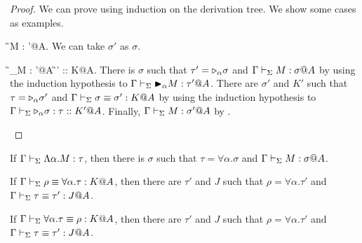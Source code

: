 \begin{proof}
    We can prove using induction on the derivation tree.
    We show some cases as examples.

    \begin{rneqncase}{\TTB{}}{\G \V M : \sigma'@A\alpha.}
        We can take $\sigma'$ as $\sigma$.
    \end{rneqncase}
    \begin{rneqncase}{\TConv{}}{
            \G \V \TB_\alpha M : \tau'@A  \G\V\tau' \E \tau :: K@A.
            }
            There is $\sigma$ such that $\tau' = {\mathop{\triangleright}}_\alpha \sigma$ and $\G \V M : \sigma@A$
            by using the induction hypothesis to \( \Gamma \vdash_\Sigma {\mathop{\blacktriangleright}}_\alpha M : \tau' @A\).
            There are $\sigma'$ and $K'$ such that $\tau = {\mathop{\triangleright}}_\alpha \sigma'$ and $\Gamma \vdash_\Sigma \sigma \equiv \sigma' : K @ A$
            by using the induction hypothesis to \( \Gamma \vdash_\Sigma {\mathop{\triangleright}}_\alpha \sigma : \tau :: K' @A\).
            Finally, $\Gamma \vdash_\Sigma M : \sigma' @ A $ by \TConv.
    \end{rneqncase}

\end{proof}

\begin{lemma}
    \label{lemma:InversionForForallType}
    \begin{item}
    \item If $\Gamma \vdash_\Sigma \Lambda\alpha.M : \tau$, then
        there is $\sigma$ such that $\tau = \forall\alpha.\sigma$ and $\G \V M : \sigma@A$.%
    \item If $\Gamma \vdash_\Sigma \rho \equiv \forall\alpha.\tau : K @A$, then there are $\tau'$ and $J$ such that
        $\rho = \forall\alpha.\tau'$ and $\Gamma \vdash_\Sigma \tau \equiv \tau' : J @A$.
    \item If $\Gamma \vdash_\Sigma \forall\alpha.\tau \equiv \rho : K @A$, then there are $\tau'$ and $J$ such that
        $\rho = \forall\alpha.\tau'$ and $\Gamma \vdash_\Sigma \tau \equiv \tau' : J @A$.
    \end{item}
\end{lemma}

